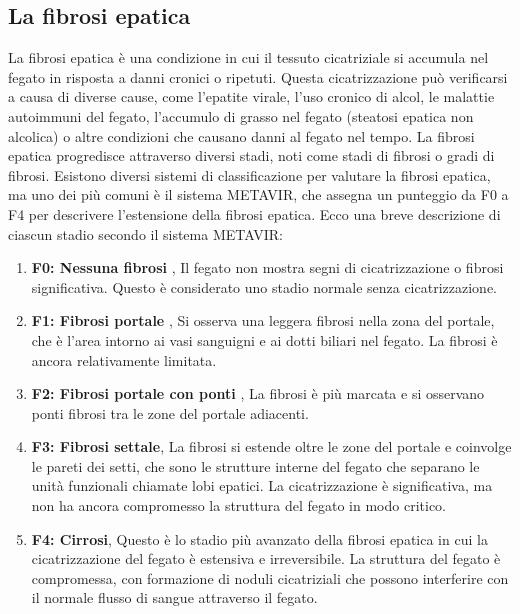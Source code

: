 \documentclass[italian,12pt,a4paper]{article}
\begin{document}
	
	\subsection{La fibrosi epatica}
 
    La fibrosi epatica è una condizione in cui il tessuto cicatriziale si accumula nel fegato in risposta a danni cronici o ripetuti. Questa cicatrizzazione può verificarsi a causa di diverse cause, come l'epatite virale, l'uso cronico di alcol, le malattie autoimmuni del fegato, l'accumulo di grasso nel fegato (steatosi epatica non alcolica) o altre condizioni che causano danni al fegato nel tempo.
    La fibrosi epatica progredisce attraverso diversi stadi, noti come stadi di fibrosi o gradi di fibrosi. Esistono diversi sistemi di classificazione per valutare la fibrosi epatica, ma uno dei più comuni è il sistema METAVIR, che assegna un punteggio da F0 a F4 per descrivere l'estensione della fibrosi epatica. Ecco una breve descrizione di ciascun stadio secondo il sistema METAVIR:
    \\
    
    \begin{enumerate}
		\item \textbf{F0: Nessuna fibrosi },  Il fegato non mostra segni di cicatrizzazione o fibrosi significativa. Questo è considerato uno stadio normale senza cicatrizzazione.
		\item \textbf{F1: Fibrosi portale }, Si osserva una leggera fibrosi nella zona del portale, che è l'area intorno ai vasi sanguigni e ai dotti biliari nel fegato. La fibrosi è ancora relativamente limitata.
		\item \textbf{F2: Fibrosi portale con ponti }, La fibrosi è più marcata e si osservano ponti fibrosi tra le zone del portale adiacenti.
		\item \textbf{F3: Fibrosi settale}, La fibrosi si estende oltre le zone del portale e coinvolge le pareti dei setti, che sono le strutture interne del fegato che separano le unità funzionali chiamate lobi epatici. La cicatrizzazione è significativa, ma non ha ancora compromesso la struttura del fegato in modo critico.
		\item \textbf{F4: Cirrosi}, Questo è lo stadio più avanzato della fibrosi epatica in cui la cicatrizzazione del fegato è estensiva e irreversibile. La struttura del fegato è compromessa, con formazione di noduli cicatriziali che possono interferire con il normale flusso di sangue attraverso il fegato.
	\end{enumerate} 
\end{document}
